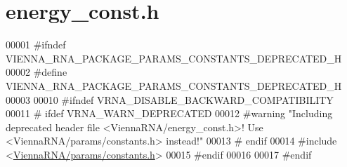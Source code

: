 \hypertarget{energy__const_8h_source}{}\section{energy\+\_\+const.\+h}
\label{energy__const_8h_source}

\begin{DoxyCode}
00001 \textcolor{preprocessor}{#ifndef VIENNA\_RNA\_PACKAGE\_PARAMS\_CONSTANTS\_DEPRECATED\_H}
00002 \textcolor{preprocessor}{#define VIENNA\_RNA\_PACKAGE\_PARAMS\_CONSTANTS\_DEPRECATED\_H}
00003 
00010 \textcolor{preprocessor}{#ifndef VRNA\_DISABLE\_BACKWARD\_COMPATIBILITY}
00011 \textcolor{preprocessor}{# ifdef VRNA\_WARN\_DEPRECATED}
00012 \textcolor{preprocessor}{#warning "Including deprecated header file <ViennaRNA/energy\_const.h>! Use <ViennaRNA/params/constants.h>
       instead!"}
00013 \textcolor{preprocessor}{# endif}
00014 \textcolor{preprocessor}{#include <\hyperlink{constants_8h}{ViennaRNA/params/constants.h}>}
00015 \textcolor{preprocessor}{#endif}
00016 
00017 \textcolor{preprocessor}{#endif}
\end{DoxyCode}
